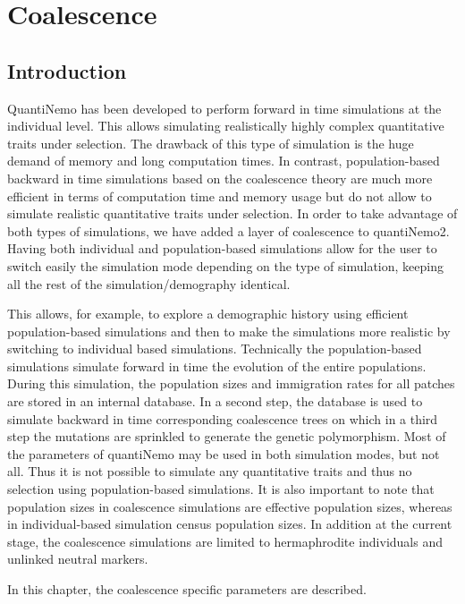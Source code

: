 \documentclass[letterpaper,12pt,oneside]{book}
\begin{document}
\chapter{Coalescence}\label{chap:Coalescence}
\section{Introduction}
QuantiNemo has been developed to perform forward in time simulations at the individual level. This allows simulating realistically highly complex quantitative traits under selection. The drawback of this type of simulation is the huge demand of memory and long computation times. In contrast, population-based backward in time simulations based on the coalescence theory are much more efficient in terms of computation time and memory usage but do not allow to simulate realistic quantitative traits under selection. In order to take advantage of both types of simulations, we have added a layer of coalescence to quantiNemo2. Having both individual and population-based simulations allow for the user to switch easily the simulation mode depending on the type of simulation, keeping all the rest of the simulation/demography identical. 

This allows, for example, to explore a demographic history using efficient population-based simulations and then to make the simulations more realistic by switching to individual based simulations. Technically the population-based simulations simulate forward in time the evolution of the entire populations. During this simulation, the population sizes and immigration rates for all patches are stored in an internal database. In a second step, the database is used to simulate backward in time corresponding coalescence trees on which in a third step the mutations are sprinkled to generate the genetic polymorphism.
Most of the parameters of quantiNemo may be used in both simulation modes, but not all. Thus it is not possible to simulate any quantitative traits and thus no selection using population-based simulations. It is also important to note that population sizes in coalescence simulations are effective population sizes, whereas in individual-based simulation census population sizes. In addition at the current stage, the coalescence simulations are limited to hermaphrodite individuals and unlinked neutral markers. 

In this chapter, the coalescence specific parameters are described.
\end{document}

